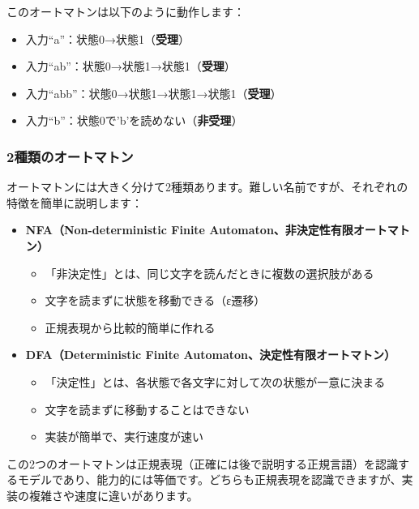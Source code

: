 このオートマトンは以下のように動作します：

\begin{itemize}
\tightlist
\item
  入力``a''：状態0→状態1（\textbf{受理}）
\item
  入力``ab''：状態0→状態1→状態1（\textbf{受理}）
\item
  入力``abb''：状態0→状態1→状態1→状態1（\textbf{受理}）
\item
  入力``b''：状態0で'b'を読めない（\textbf{非受理}）
\end{itemize}

\hypertarget{chapter4-ux7a2eux985eux306eux30aaux30fcux30c8ux30deux30c8ux30f3}{%
\subsubsection{2種類のオートマトン}\label{chapter4-ux7a2eux985eux306eux30aaux30fcux30c8ux30deux30c8ux30f3}}

オートマトンには大きく分けて2種類あります。難しい名前ですが、それぞれの特徴を簡単に説明します：

\begin{itemize}
\tightlist
\item
  \textbf{NFA（Non-deterministic Finite
  Automaton、非決定性有限オートマトン）}

  \begin{itemize}
  \tightlist
  \item
    「非決定性」とは、同じ文字を読んだときに複数の選択肢がある
  \item
    文字を読まずに状態を移動できる（ε遷移）
  \item
    正規表現から比較的簡単に作れる
  \end{itemize}
\item
  \textbf{DFA（Deterministic Finite Automaton、決定性有限オートマトン）}

  \begin{itemize}
  \tightlist
  \item
    「決定性」とは、各状態で各文字に対して次の状態が一意に決まる
  \item
    文字を読まずに移動することはできない
  \item
    実装が簡単で、実行速度が速い
  \end{itemize}
\end{itemize}

この2つのオートマトンは正規表現（正確には後で説明する正規言語）を認識するモデルであり、能力的には等価です。どちらも正規表現を認識できますが、実装の複雑さや速度に違いがあります。

